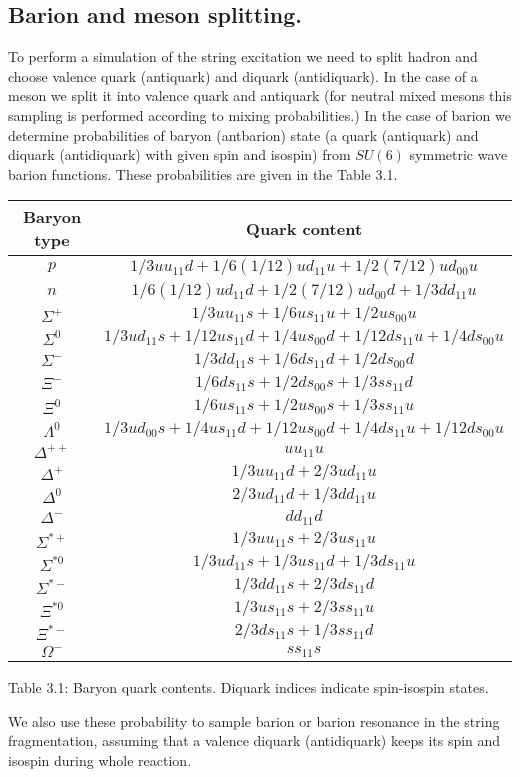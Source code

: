 \subsection{Barion and meson splitting.}
\hspace{1.0em}To perform
 a simulation of the string excitation we need to split hadron and
choose valence quark (antiquark) and diquark (antidiquark). In the case 
of a meson we split it into valence quark and antiquark (for neutral mixed 
mesons this sampling is performed according to mixing probabilities.)
In the case of barion we determine probabilities of baryon (antbarion) 
state (a quark (antiquark) and 
diquark (antidiquark) with given spin and isospin)
 from $SU(6)$ symmetric wave barion functions. These probabilities are 
 given in the Table 3.1. 
\hspace{1.0em}
\begin{table}
\begin{center}
\begin{tabular}{|c|c|}
\hline
Baryon type & Quark content \\
\hline
$p$         &$1/3uu_{11}d+1/6(1/12)ud_{11}u+1/2(7/12)ud_{00}u$    \\
$n$         &$1/6(1/12)ud_{11}d+1/2(7/12)ud_{00}d+1/3dd_{11}u$    \\
$\Sigma^{+}$&$1/3uu_{11}s+1/6us_{11}u+1/2us_{00}u$    \\
$\Sigma^{0}$&$1/3ud_{11}s+1/12us_{11}d+1/4us_{00}d+1/12ds_{11}u+1/4ds_{00}u$\\
$\Sigma^{-}$&$1/3dd_{11}s+1/6ds_{11}d+1/2ds_{00}d$    \\
$\Xi^{-}$   &$1/6ds_{11}s+1/2ds_{00}s+1/3ss_{11}d$    \\
$\Xi^{0}$   &$1/6us_{11}s+1/2us_{00}s+1/3ss_{11}u$    \\
$\Lambda^{0}$&$1/3ud_{00}s+1/4us_{11}d+1/12us_{00}d+1/4ds_{11}u+1/12ds_{00}u$\\
$\Delta^{++}$&$uu_{11}u$    \\
$\Delta^{+}$ &$1/3uu_{11}d+2/3ud_{11}u$    \\
$\Delta^{0}$ &$2/3ud_{11}d+1/3dd_{11}u$    \\
$\Delta^{-}$ &$dd_{11}d$    \\
$\Sigma^{*+}$&$1/3uu_{11}s+2/3us_{11}u$    \\
$\Sigma^{*0}$&$1/3ud_{11}s+1/3us_{11}d+1/3ds_{11}u$\\
$\Sigma^{*-}$&$1/3dd_{11}s+2/3ds_{11}d$    \\
$\Xi^{*0}$   &$1/3us_{11}s+2/3ss_{11}u$    \\
$\Xi^{*-}$   &$2/3ds_{11}s+1/3ss_{11}d$    \\
$\Omega^{-}$   &$ss_{11}s$    \\
\hline
\end{tabular}
\end{center}
Table 3.1: Baryon quark contents. Diquark indices indicate spin-isospin states.
\end{table}
We also  use these probability to sample barion or barion resonance in 
the string fragmentation, assuming that a valence diquark (antidiquark) 
keeps its spin and isospin during whole reaction.
